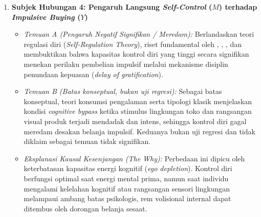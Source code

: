 \documentclass[12pt,a4paper]{article}
\numberwithin{equation}{section}
\numberwithin{table}{section}
\numberwithin{figure}{section}
\begin{document}
\begin{enumerate}
  \item \textbf{Subjek Hubungan 4: Pengaruh Langsung \emph{Self-Control} ($M$) terhadap \emph{Impulsive Buying} ($Y$)}
  \begin{itemize}
    \item \emph{Temuan A (Pengaruh Negatif Signifikan / Meredam):} Berlandaskan teori regulasi diri (\emph{Self-Regulation Theory}), riset fundamental oleh \citet{baumeister2002yield}, \citet{tangney2004high}, \citet{vohs2007spent}, dan \citet{sultan2012building} membuktikan bahwa kapasitas kontrol diri yang tinggi secara signifikan menekan perilaku pembelian impulsif melalui mekanisme disiplin penundaan kepuasan (\emph{delay of gratification}).
    \item \emph{Temuan B (Batas konseptual, bukan uji regresi):} Sebagai batas konseptual, teori konsumsi pengalaman \citet{hirschman1982hedonic} serta tipologi klasik \citet{stern1962significance} menjelaskan kondisi \emph{cognitive bypass} ketika stimulus lingkungan toko dan rangsangan visual produk terjadi mendadak dan intens, sehingga kontrol diri gagal meredam desakan belanja impulsif. Keduanya bukan uji regresi dan tidak diklaim sebagai temuan tidak signifikan.
    \item \emph{Eksplanasi Kausal Kesenjangan (\emph{The Why}):} Perbedaan ini dipicu oleh keterbatasan kapasitas energi kognitif (\emph{ego depletion}). Kontrol diri berfungsi optimal saat energi mental prima, namun saat individu mengalami kelelahan kognitif atau rangsangan sensori lingkungan melampaui ambang batas psikologis, rem volisional internal dapat ditembus oleh dorongan belanja sesaat.
  \end{itemize}


\end{enumerate}
\end{document}
